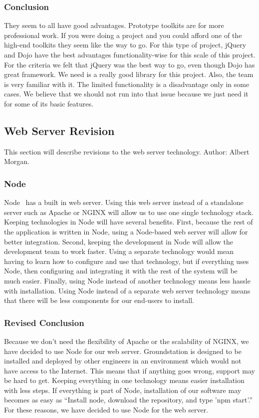 \documentclass[10pt,draftclsnofoot,onecolumn]{IEEEtran}
\begin{document}
   	\subsubsection{Conclusion}
     	They seem to all have good advantages. 
	Prototype toolkits are for more professional work.
	If you were doing a project and you could afford one of the high-end toolkits they seem like the way to go.
	For this type of project, jQuery and Dojo have the best advantages functionality-wise for this scale of this project.  
      	For the criteria we felt that jQuery was the best way to go, even though Dojo has great framework.
	We need is a really good library for this project. Also, the team is very familiar with it.
	The limited functionality is a disadvantage only in some cases.
	We believe that we should not run into that issue because we just need it for some of its basic features.
	
	\subsection{Web Server Revision}
	This section will describe revisions to the web server technology. Author: Albert Morgan.

	\subsubsection{Node}
	Node~\cite{node} has a built in web server.
	Using this web server instead of a standalone server such as Apache or NGINX will allow us to use one single technology stack.
	Keeping technologies in Node will have several benefits.
	First, because the rest of the application is written in Node, using a Node-based web server will allow for better integration.
	Second, keeping the development in Node will allow the development team to work faster.
	Using a separate technology would mean having to learn how to configure and use that technology,
	but if everything uses Node, then configuring and integrating it with the rest of the system will be much easier.
	Finally, using Node instead of another technology means less hassle with installation.
	Using Node instead of a separate web server technology means that there will be less components for our end-users to install.

	\subsubsection{Revised Conclusion}
	Because we don't need the flexibility of Apache or the scalability of NGINX, we have decided to use Node for our web server.
	Groundstation is designed to be installed and deployed by other engineers in an environment which would not have access to the Internet.
	This means that if anything goes wrong, support may be hard to get.
	Keeping everything in one technology means easier installation with less steps.
	If everything is part of Node, installation of our software may becomes as easy as
	``Install node, download the repository, and type 'npm start'.''
	For these reasons, we have decided to use Node for the web server.
\end{document}
